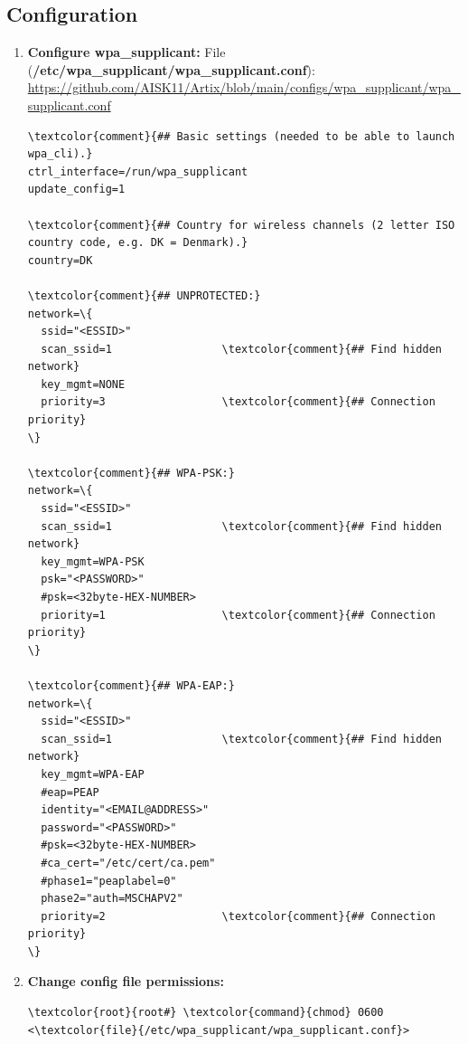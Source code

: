 \documentclass[10pt, a4paper, onecolumn, oneside, titlepage, openany]{book}
\begin{document}
\subsection{Configuration}
\begin{enumerate}
    \item \textbf{Configure wpa\_supplicant:}
\newline File (\textbf{\textcolor{file}{/etc/wpa\_supplicant/wpa\_supplicant.conf}}):
\newline \url{https://github.com/AISK11/Artix/blob/main/configs/wpa_supplicant/wpa_supplicant.conf}
\begin{Verbatim}[commandchars=\\\{\}]
\textcolor{comment}{## Basic settings (needed to be able to launch wpa_cli).}
ctrl_interface=/run/wpa_supplicant
update_config=1

\textcolor{comment}{## Country for wireless channels (2 letter ISO country code, e.g. DK = Denmark).}
country=DK

\textcolor{comment}{## UNPROTECTED:}
network=\{
  ssid="<ESSID>"
  scan_ssid=1                 \textcolor{comment}{## Find hidden network}
  key_mgmt=NONE
  priority=3                  \textcolor{comment}{## Connection priority}
\}

\textcolor{comment}{## WPA-PSK:}
network=\{
  ssid="<ESSID>"
  scan_ssid=1                 \textcolor{comment}{## Find hidden network}
  key_mgmt=WPA-PSK
  psk="<PASSWORD>"
  #psk=<32byte-HEX-NUMBER>
  priority=1                  \textcolor{comment}{## Connection priority}
\}

\textcolor{comment}{## WPA-EAP:}
network=\{
  ssid="<ESSID>"
  scan_ssid=1                 \textcolor{comment}{## Find hidden network}
  key_mgmt=WPA-EAP
  #eap=PEAP
  identity="<EMAIL@ADDRESS>"
  password="<PASSWORD>"
  #psk=<32byte-HEX-NUMBER>
  #ca_cert="/etc/cert/ca.pem"
  #phase1="peaplabel=0"
  phase2="auth=MSCHAPV2"
  priority=2                  \textcolor{comment}{## Connection priority}
\}
\end{Verbatim}    
    \item \textbf{Change config file permissions:}
\begin{Verbatim}[commandchars=\\\{\}]
\textcolor{root}{root#} \textcolor{command}{chmod} 0600 <\textcolor{file}{/etc/wpa_supplicant/wpa_supplicant.conf}>
\end{Verbatim}
\end{enumerate}
\end{document}
